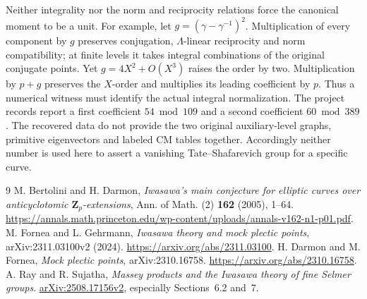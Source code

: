 \documentclass[11pt]{article}
\newcommand{\Z}{\mathbf Z}
\begin{document}
Neither integrality nor the norm and reciprocity relations force the
canonical moment to be a unit. For example, let
$g=(\gamma-\gamma^{-1})^2$. Multiplication of every component by $g$
preserves conjugation, $\Lambda$-linear reciprocity and norm
compatibility; at finite levels it takes integral combinations of
the original conjugate points. Yet $g=4X^2+O(X^3)$ raises the order
by two. Multiplication by $p+g$ preserves the $X$-order and multiplies
its leading coefficient by $p$. Thus a numerical witness must identify
the actual integral normalization. The project records report a
first coefficient $54\bmod109$ and a second coefficient $60\bmod389$.
The recovered data do not provide the two original auxiliary-level
graphs, primitive eigenvectors and labeled CM tables together.
Accordingly neither number is used here to assert a vanishing
Tate--Shafarevich group for a specific curve.

\begin{thebibliography}{9}
M. Bertolini and H. Darmon,
\emph{Iwasawa's main conjecture for elliptic curves over anticyclotomic \(\Z_p\)-extensions},
Ann. of Math. (2) \textbf{162} (2005), 1--64.
\url{https://annals.math.princeton.edu/wp-content/uploads/annals-v162-n1-p01.pdf}.
M. Fornea and L. Gehrmann,
\emph{Iwasawa theory and mock plectic points}, arXiv:2311.03100v2 (2024).
\url{https://arxiv.org/abs/2311.03100}.
H. Darmon and M. Fornea, \emph{Mock plectic points}, arXiv:2310.16758.
\url{https://arxiv.org/abs/2310.16758}.
A. Ray and R. Sujatha, \emph{Massey products and the Iwasawa theory
of fine Selmer groups}. \href{https://arxiv.org/abs/2508.17156v2}{arXiv:2508.17156v2},
especially Sections~6.2 and~7.
\end{thebibliography}
\end{document}
